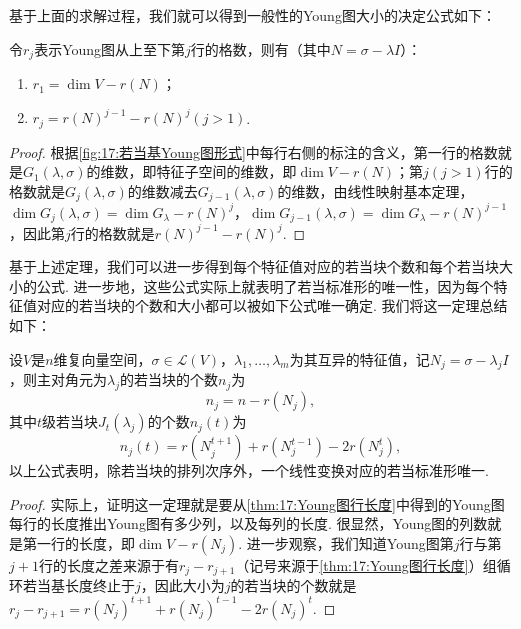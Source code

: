 基于上面的求解过程，我们就可以得到一般性的Young图大小的决定公式如下：
\begin{theorem} \label{thm:17:Young图行长度}
    令$r_j$表示Young图从上至下第$j$行的格数，则有（其中$N=\sigma-\lambda I$）：
    \begin{enumerate}
    \item $r_1=\dim V-r(N)$；
    \item $r_j=r(N)^{j-1}-r(N)^j(j>1)$.
    \end{enumerate}
\end{theorem}
\begin{proof}
    根据\autoref{fig:17:若当基Young图形式}中每行右侧的标注的含义，第一行的格数就是$G_1(\lambda,\sigma)$的维数，即特征子空间的维数，即$\dim V-r(N)$；第$j(j>1)$行的格数就是$G_j(\lambda,\sigma)$的维数减去$G_{j-1}(\lambda,\sigma)$的维数，由线性映射基本定理，$\dim G_j(\lambda,\sigma)=\dim G_\lambda-r(N)^j$，$\dim G_{j-1}(\lambda,\sigma)=\dim G_\lambda-r(N)^{j-1}$，因此第$j$行的格数就是$r(N)^{j-1}-r(N)^j$.
\end{proof}

基于上述定理，我们可以进一步得到每个特征值对应的若当块个数和每个若当块大小的公式. 进一步地，这些公式实际上就表明了若当标准形的唯一性，因为每个特征值对应的若当块的个数和大小都可以被如下公式唯一确定. 我们将这一定理总结如下：
\begin{theorem} \label{thm:17:若当标准形唯一}
    设$V$是$n$维复向量空间，$\sigma\in \mathcal{L}(V)$，$\lambda_1,\ldots,\lambda_m$为其互异的特征值，记$N_j=\sigma-\lambda_j I$，则主对角元为$\lambda_j$的若当块的个数$n_j$为
    \begin{equation} \label{eq:17:若当块个数}
        n_j=n-r(N_j),
    \end{equation}
    其中$t$级若当块$J_t(\lambda_j)$的个数$n_j(t)$为
    \begin{equation} \label{eq:17:若当块大小}
        n_j(t)=r(N_j^{t+1})+r(N_j^{t-1})-2r(N_j^t),
    \end{equation}
    以上公式表明，除若当块的排列次序外，一个线性变换对应的若当标准形唯一.
\end{theorem}
\begin{proof}
    实际上，证明这一定理就是要从\autoref{thm:17:Young图行长度}中得到的Young图每行的长度推出Young图有多少列，以及每列的长度. 很显然，Young图的列数就是第一行的长度，即$\dim V-r(N_j)$. 进一步观察，我们知道Young图第$j$行与第$j+1$行的长度之差来源于有$r_j-r_{j+1}$（记号来源于\autoref{thm:17:Young图行长度}）组循环若当基长度终止于$j$，因此大小为$j$的若当块的个数就是$r_j-r_{j+1}=r(N_j)^{t+1}+r(N_j)^{t-1}-2r(N_j)^t$.
\end{proof}


